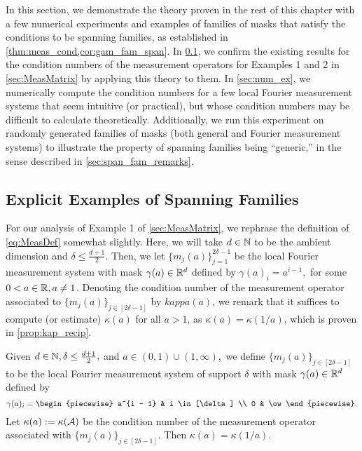 In this section, we demonstrate the theory proven in the rest of this chapter with a few numerical experiments and examples of families of masks that satisfy the conditions to be spanning families, as established in \cref{thm:meas_cond,cor:gam_fam_span}.  In \cref{sec:reanalyze}, we confirm the existing results for the condition numbers of the measurement operators for Examples 1 and 2 in \cref{sec:MeasMatrix} by applying this theory to them.  In \cref{sec:num_ex}, we numerically compute the condition numbers for a few local Fourier measurement systems that seem intuitive (or practical), but whose condition numbers may be difficult to calculate theoretically.  Additionally, we run this experiment on randomly generated families of masks (both general and Fourier measurement systems) to illustrate the property of spanning families being ``generic,'' in the sense described in \cref{sec:span_fam_remarks}.

\subsection{Explicit Examples of Spanning Families}
\label{sec:reanalyze}

For our analysis of Example 1 of \cref{sec:MeasMatrix}, we rephrase the definition of \eqref{eq:MeasDef} somewhat slightly.  Here, we will take $d \in \mathbb{N}$ to be the ambient dimension and $\delta \le \frac{d + 1}{2}$.  Then, we let $\{m_j(a)\}_{j = 1}^{2 \delta - 1}$ be the local Fourier measurement system with mask $\gamma(a) \in \mathbb{R}^d$ defined by $\gamma(a)_i = a^{i - 1},$ for some $0 < a \in \mathbb{R}, a \neq 1$.  Denoting the condition number of the measurement operator associated to $\{m_j(a)\}_{j \in [2 \delta - 1]}$ by $kappa(a)$, we remark that it suffices to compute (or estimate) $\kappa(a)$ for all $a > 1$, as $\kappa(a) = \kappa(1 / a)$, which is proven in \cref{prop:kap_recip}.

\begin{proposition}
  Given $d \in \mathbb{N}, \delta \le \frac{d + 1}{2},$ and $a \in (0, 1) \cup (1, \infty),$ we define $\{m_j(a)\}_{j \in [2 \delta - 1]}$ to be the local Fourier measurement system of support $\delta$ with mask $\gamma(a) \in \mathbb{R}^d$ defined by \[\gamma(a)_i = \begin{piecewise} a^{i - 1} & i \in [\delta] \\ 0 & \ow \end{piecewise}.\]  Let $\kappa(a) := \kappa(\mathcal{A})$ be the condition number of the measurement operator associated with $\{m_j(a)\}_{j \in [2 \delta - 1]}$.  Then $\kappa(a) = \kappa(1 / a)$.
  \label{prop:kap_recip}
\end{proposition}

